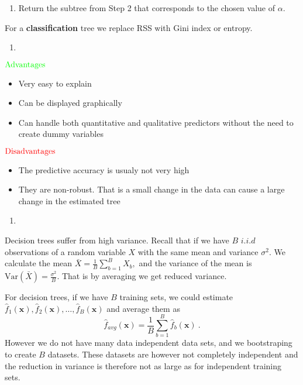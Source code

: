 \documentclass[]{article}
\providecommand{\tightlist}{%
  \setlength{\itemsep}{0pt}\setlength{\parskip}{0pt}}
\begin{document}
\begin{enumerate}
\def\labelenumi{\arabic{enumi}.}
\setcounter{enumi}{3}
\tightlist
\item
  Return the subtree from Step 2 that corresponds to the chosen value of
  \(\alpha.\)
\end{enumerate}

For a \textbf{classification} tree we replace RSS with Gini index or
entropy.

\begin{enumerate}
\def\labelenumi{\alph{enumi})}
\setcounter{enumi}{1}
\item
\end{enumerate}

\(\color{green}{\text{Advantages}}\)

\begin{itemize}
\item
  Very easy to explain
\item
  Can be displayed graphically
\item
  Can handle both quantitative and qualitative predictors without the
  need to create dummy variables
\end{itemize}

\(\color{red}{\text{Disadvantages}}\)

\begin{itemize}
\item
  The predictive accuracy is usualy not very high
\item
  They are non-robust. That is a small change in the data can cause a
  large change in the estimated tree
\end{itemize}

\begin{enumerate}
\def\labelenumi{\alph{enumi})}
\setcounter{enumi}{2}
\item
\end{enumerate}

Decision trees suffer from high variance. Recall that if we have \(B\)
\(i.i.d\) observations of a random variable \(X\) with the same mean and
variance \(\sigma^2.\) We calculate the mean
\(\bar{X} = \frac{1}{B} \sum_{b=1}^B X_b,\) and the variance of the mean
is \(\text{Var}(\bar{X}) = \frac{\sigma^2}{B}.\) That is by averaging we
get reduced variance.

For decision trees, if we have \(B\) training sets, we could estimate
\(\hat{f}_1({\boldsymbol x}),\hat{f}_2({\boldsymbol x}),\ldots, \hat{f}_B({\boldsymbol x})\)
and average them as
\[\hat{f}_{avg}({\boldsymbol x})=\frac{1}{B}\sum_{b=1}^B \hat{f}_b({\boldsymbol x}) \ .\]
However we do not have many data independent data sets, and we
bootstraping to create \(B\) datasets. These datasets are however not
completely independent and the reduction in variance is therefore not as
large as for independent training sets.
\end{document}
